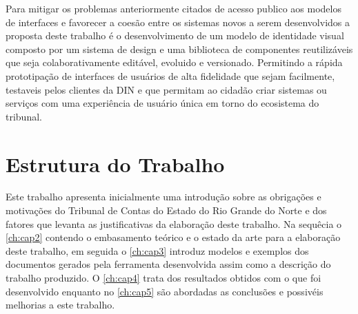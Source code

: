   Para mitigar os problemas anteriormente citados de acesso publico aos modelos de interfaces e favorecer a coesão entre os sistemas novos a serem desenvolvidos a proposta deste trabalho é o desenvolvimento de um modelo de identidade visual composto por um sistema de design e uma biblioteca de componentes reutilizáveis que seja colaborativamente editável, evoluido e versionado. Permitindo a rápida prototipação de interfaces de usuários de alta fidelidade que sejam facilmente, testaveis pelos clientes da DIN e que permitam ao cidadão criar sistemas ou serviços com uma experiência de usuário única em torno do ecosistema do tribunal.



  \section{Estrutura do Trabalho}
  Este trabalho apresenta inicialmente uma introdução sobre as obrigações e motivações do Tribunal de Contas do Estado do Rio Grande do Norte e dos fatores que levanta as justificativas da elaboração deste trabalho.
  Na sequêcia o \autoref{ch:cap2} contendo o embasamento teórico e o estado da arte para a elaboração deste trabalho, em seguida o \autoref{ch:cap3} introduz modelos e exemplos dos documentos gerados pela ferramenta desenvolvida assim como a descrição do trabalho produzido. O \autoref{ch:cap4} trata dos resultados obtidos com o que foi desenvolvido enquanto no \autoref{ch:cap5} são abordadas as conclusões e possivéis melhorias a este trabalho.
